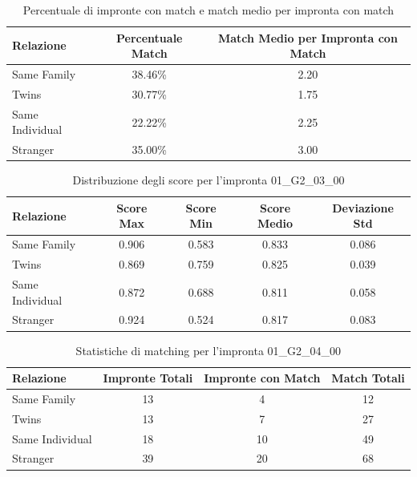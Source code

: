\begin{table}[htbp]
\centering
\caption{Percentuale di impronte con match e match medio per impronta con match}
\label{tab:match_percentage_01_G2_03_00}
\begin{tabular}{|l|c|c|}
\hline
\textbf{Relazione} & \textbf{Percentuale Match} & \textbf{Match Medio per Impronta con Match} \\
\hline
Same Family & 38.46\% & 2.20 \\
\hline
Twins & 30.77\% & 1.75 \\
\hline
Same Individual & 22.22\% & 2.25 \\
\hline
Stranger & 35.00\% & 3.00 \\
\hline
\end{tabular}
\end{table}


\begin{table}[htbp]
\centering
\caption{Distribuzione degli score per l'impronta 01\_G2\_03\_00}
\label{tab:scores_01_G2_03_00}
\begin{tabular}{|l|c|c|c|c|}
\hline
\textbf{Relazione} & \textbf{Score Max} & \textbf{Score Min} & \textbf{Score Medio} & \textbf{Deviazione Std} \\
\hline
Same Family & 0.906 & 0.583 & 0.833 & 0.086 \\
\hline
Twins & 0.869 & 0.759 & 0.825 & 0.039 \\
\hline
Same Individual & 0.872 & 0.688 & 0.811 & 0.058 \\
\hline
Stranger & 0.924 & 0.524 & 0.817 & 0.083 \\
\hline
\end{tabular}
\end{table}


\begin{table}[htbp]
\centering
\caption{Statistiche di matching per l'impronta 01\_G2\_04\_00}
\label{tab:results_01_G2_04_00}
\begin{tabular}{|l|c|c|c|}
\hline
\textbf{Relazione} & \textbf{Impronte Totali} & \textbf{Impronte con Match} & \textbf{Match Totali} \\
\hline
Same Family & 13 & 4 & 12 \\
\hline
Twins & 13 & 7 & 27 \\
\hline
Same Individual & 18 & 10 & 49 \\
\hline
Stranger & 39 & 20 & 68 \\
\hline
\end{tabular}
\end{table}


